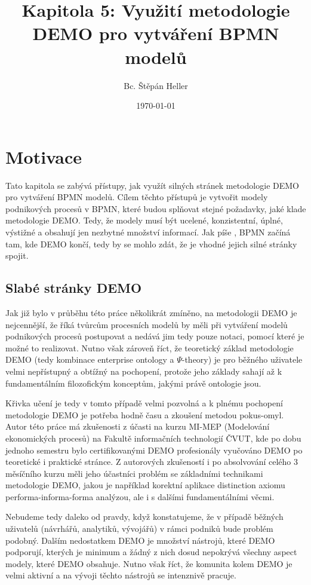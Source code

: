 \documentclass[]{article}
\newcommand{\ptheory}{$\Psi$-theory}
\begin{document}
\title{Kapitola 5: Využití metodologie DEMO pro vytváření BPMN modelů}
\author{Bc. Štěpán Heller}
\date{\today}
\maketitle

\section{Motivace} \label{sec:motivace}
Tato kapitola se zabývá přístupy, jak využít silných stránek metodologie DEMO pro vytváření BPMN modelů. Cílem těchto přístupů je vytvořit modely podnikových procesů v BPMN, které budou splňovat stejné požadavky, jaké klade metodologie DEMO. Tedy, že modely musí být ucelené, konzistentní, úplné, výstižné a obsahují jen nezbytné množství informací. Jak píše \cite{VanNuffel2009}, BPMN začíná tam, kde DEMO končí, tedy by se mohlo zdát, že je vhodné jejich silné stránky spojit.

\subsection{Slabé stránky DEMO}
Jak již bylo v průběhu této práce několikrát zmíněno, na metodologii DEMO je nejcennější, že říká tvůrcům procesních modelů  by měli při vytváření modelů podnikových procesů postupovat a nedává jim tedy pouze notaci, pomocí které je možné to realizovat. Nutno však zároveň říct, že teoretický základ metodologie DEMO (tedy kombinace enterprise ontology a \ptheory) je pro běžného uživatele velmi nepřístupný a obtížný na pochopení, protože jeho základy sahají až k fundamentálním filozofickým konceptům, jakými právě ontologie jsou. 

Křivka učení je tedy v tomto případě velmi pozvolná a k plnému pochopení metodologie DEMO je potřeba hodně času a zkoušení metodou pokus-omyl. Autor této práce má zkušenosti z účasti na kurzu MI-MEP (Modelování ekonomických procesů) na Fakultě informačních technologií ČVUT, kde po dobu jednoho semestru bylo certifikovanými DEMO profesionály vyučováno DEMO po teoretické i praktické stránce. Z autorových zkušeností i po absolvování celého 3 měsíčního kurzu měli jeho účastníci problém se základními technikami metodologie DEMO, jakou je například korektní aplikace distinction axiomu performa-informa-forma analýzou, ale i s dalšími fundamentálními věcmi.

Nebudeme tedy daleko od pravdy, když konstatujeme, že v případě běžných uživatelů (návrhářů, analytiků, vývojářů) v rámci podniků bude problém podobný. Dalším nedostatkem DEMO je množství nástrojů, které DEMO podporují, kterých je minimum a žádný z nich dosud nepokrývá všechny aspect modely, které DEMO obsahuje. Nutno však říct, že komunita kolem DEMO je velmi aktivní a na vývoji těchto nástrojů se intenznivě pracuje.
\end{document}
